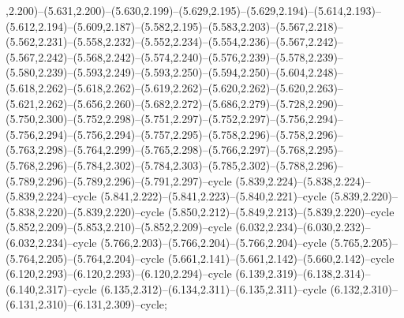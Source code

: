 ,2.200)--(5.631,2.200)--(5.630,2.199)--(5.629,2.195)--(5.629,2.194)--(5.614,2.193)--(5.612,2.194)--(5.609,2.187)--(5.582,2.195)--(5.583,2.203)--(5.567,2.218)--(5.562,2.231)--(5.558,2.232)--(5.552,2.234)--(5.554,2.236)--(5.567,2.242)--(5.567,2.242)--(5.568,2.242)--(5.574,2.240)--(5.576,2.239)--(5.578,2.239)--(5.580,2.239)--(5.593,2.249)--(5.593,2.250)--(5.594,2.250)--(5.604,2.248)--(5.618,2.262)--(5.618,2.262)--(5.619,2.262)--(5.620,2.262)--(5.620,2.263)--(5.621,2.262)--(5.656,2.260)--(5.682,2.272)--(5.686,2.279)--(5.728,2.290)--(5.750,2.300)--(5.752,2.298)--(5.751,2.297)--(5.752,2.297)--(5.756,2.294)--(5.756,2.294)--(5.756,2.294)--(5.757,2.295)--(5.758,2.296)--(5.758,2.296)--(5.763,2.298)--(5.764,2.299)--(5.765,2.298)--(5.766,2.297)--(5.768,2.295)--(5.768,2.296)--(5.784,2.302)--(5.784,2.303)--(5.785,2.302)--(5.788,2.296)--(5.789,2.296)--(5.789,2.296)--(5.791,2.297)--cycle (5.839,2.224)--(5.838,2.224)--(5.839,2.224)--cycle (5.841,2.222)--(5.841,2.223)--(5.840,2.221)--cycle (5.839,2.220)--(5.838,2.220)--(5.839,2.220)--cycle (5.850,2.212)--(5.849,2.213)--(5.839,2.220)--cycle (5.852,2.209)--(5.853,2.210)--(5.852,2.209)--cycle (6.032,2.234)--(6.030,2.232)--(6.032,2.234)--cycle (5.766,2.203)--(5.766,2.204)--(5.766,2.204)--cycle (5.765,2.205)--(5.764,2.205)--(5.764,2.204)--cycle (5.661,2.141)--(5.661,2.142)--(5.660,2.142)--cycle (6.120,2.293)--(6.120,2.293)--(6.120,2.294)--cycle (6.139,2.319)--(6.138,2.314)--(6.140,2.317)--cycle (6.135,2.312)--(6.134,2.311)--(6.135,2.311)--cycle (6.132,2.310)--(6.131,2.310)--(6.131,2.309)--cycle;
